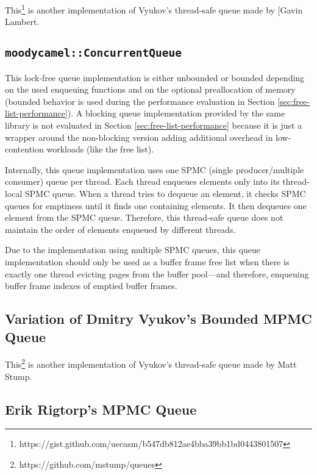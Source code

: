 	This\footnote{https://gist.github.com/uecasm/b547db812ae4bba39bb1bd0443801507} is another implementation of Vyukov's thread-safe queue made by [Gavin Lambert.

\subsection[\lstinline{moodycamel::ConcurrentQueue}]{\lstinline{moodycamel::ConcurrentQueue}} \label{subsec:moodycamel}

	This lock-free queue implementation is either unbounded or bounded depending on the used enqueuing functions and on the optional preallocation of memory (bounded behavior is used during the performance evaluation in Section \ref{sec:free-list-performance}). A blocking queue implementation provided by the same library is not evaluated in Section \ref{sec:free-list-performance} because it is just a wrapper around the non-blocking version adding additional overhead in low-contention workloads (like the free list).
	
	Internally, this queue implementation uses one SPMC (single producer/multiple consumer) queue per thread. Each thread enqueues elements only into its thread-local SPMC queue. When a thread tries to dequeue an element, it checks SPMC queues for emptiness until it finds one containing elements. It then dequeues one element from the SPMC queue. Therefore, this thread-safe queue does not maintain the order of elements enqueued by different threads.
	
	Due to the implementation using multiple SPMC queues, this queue implementation should only be used as a buffer frame free list when there is exactly one thread evicting pages from the buffer pool---and therefore, enqueuing buffer frame indexes of emptied buffer frames.

\subsection[Variation of Dmitry Vyukov's MPMC Queue]{Variation of Dmitry Vyukov's Bounded MPMC Queue} \label{subsec:vyukov-variation}

	This\footnote{https://github.com/mstump/queues} is another implementation of Vyukov's thread-safe queue made by Matt Stump.

\subsection[Erik Rigtorp's MPMC Queue]{Erik Rigtorp's MPMC Queue} \label{subsec:rigtorp}

